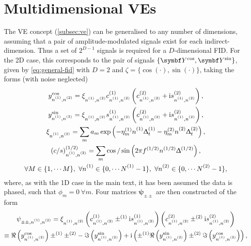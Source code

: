 \section{Multidimensional \aclp{VE}}
\label{sec:multidim-ve}
The \ac{VE} concept (\cref{subsec:ve}) can be generalised to any number
of dimensions, assuming that a pair of amplitude-modulated signals exist for
each indirect-dimension. Thus a set of $2^{D-1}$ signals is required for a
$D$-dimensional \ac{FID}.
For the \ac{2D} case, this corresponds to the pair of signals $\lbrace
\bY^{\cos}, \bY^{\sin} \rbrace$, given by \cref{eq:general-fid} with $D=2$ and
$\zeta = \lbrace \cos(\cdot), \sin(\cdot) \rbrace$, taking the forms (with
noise neglected)
\begin{subequations}
    \begin{gather}
        y^{\cos}_{\none,\ntwo} =
            \xi^{\vphantom{(1)}}_{\none,\ntwo}
            c^{(1)}_{\none,\ntwo}
            \left(c^{(2)}_{\none,\ntwo} + \iu s^{(2)}_{\none,\ntwo}\right),\\
        y^{\sin}_{\none,\ntwo} =
            \xi^{\vphantom{(1)}}_{\none,\ntwo}
            s^{(1)}_{\none,\ntwo}
            \left(c^{(2)}_{\none,\ntwo} + \iu s^{(2)}_{\none,\ntwo}\right),\\
        \xi^{\vphantom{(1)}}_{\none,\ntwo} =
            \sum_m a_m \exp\left(-\etaonem \none \Dtone -\etatwom \ntwo \Dttwo\right),\\
        (c/s)^{(1/2)}_{\none,\ntwo} =
            \sum_m \cos / \sin \left(2 \pi f^{(1/2)} n^{(1/2)} \Updelta^{(1/2)}\right),\\
        \forall M \in \lbrace 1, \cdots M \rbrace,
        \ \forall \none \in \lbrace 0, \cdots \None - 1 \rbrace,
        \ \forall \ntwo \in \lbrace 0, \cdots \Ntwo - 1 \rbrace,\notag
    \end{gather}
\end{subequations}
where, as with the \ac{1D} case in the main text, it has been assumed the data
is phased, such that $\phi_m = 0\ \forall m$.
Four matrices $\symbf{\psi}_{\pm\pm}$ are then constructed of the form
\begin{equation}
    \begin{gathered}
        \psi_{\pm\pm, \none, \ntwo} =
            \xi_{\none,\ntwo}^{\vphantom{(1)}}
            \left(c^{(1)}_{\none,\ntwo} \pm^{(1)} \iu s^{(1)}_{\none,\ntwo}\right)
            \left(c^{(2)}_{\none,\ntwo} \pm^{(2)} \iu s^{(2)}_{\none,\ntwo}\right)\\
         \equiv
             \Re\left( y^{\cos}_{\none,\ntwo} \right)
             \pm^{(1)} \pm^{(2)} -
             \Im\left( y^{\sin}_{\none,\ntwo} \right)
             + \iu \left(
             \pm^{(1)}
             \Re\left( y^{\sin}_{\none,\ntwo} \right)
             \pm^{(2)}
             \Im\left( y^{\cos}_{\none,\ntwo} \right)
             \right),
    \end{gathered}
\end{equation}
